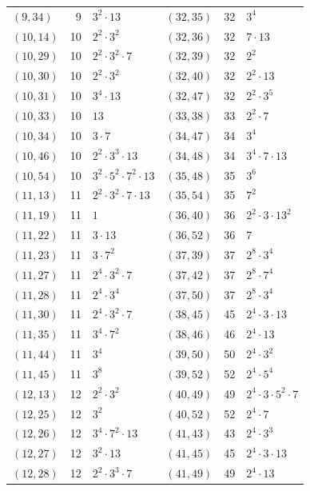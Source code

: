 \documentclass[11pt]{article}
\begin{document}
\begin{longtable}{@{}lrl@{\qquad}lrl@{}}
$(9,34)$ & 9 & $3^{2}\cdot 13$ & $(32,35)$ & 32 & $3^{4}$\\
$(10,14)$ & 10 & $2^{2}\cdot 3^{2}$ & $(32,36)$ & 32 & $7\cdot 13$\\
$(10,29)$ & 10 & $2^{2}\cdot 3^{2}\cdot 7$ & $(32,39)$ & 32 & $2^{2}$\\
$(10,30)$ & 10 & $2^{2}\cdot 3^{2}$ & $(32,40)$ & 32 & $2^{2}\cdot 13$\\
$(10,31)$ & 10 & $3^{4}\cdot 13$ & $(32,47)$ & 32 & $2^{2}\cdot 3^{5}$\\
$(10,33)$ & 10 & $13$ & $(33,38)$ & 33 & $2^{2}\cdot 7$\\
$(10,34)$ & 10 & $3\cdot 7$ & $(34,47)$ & 34 & $3^{4}$\\
$(10,46)$ & 10 & $2^{2}\cdot 3^{3}\cdot 13$ & $(34,48)$ & 34 & $3^{4}\cdot 7\cdot 13$\\
$(10,54)$ & 10 & $3^{2}\cdot 5^{2}\cdot 7^{2}\cdot 13$ & $(35,48)$ & 35 & $3^{6}$\\
$(11,13)$ & 11 & $2^{2}\cdot 3^{2}\cdot 7\cdot 13$ & $(35,54)$ & 35 & $7^{2}$\\
$(11,19)$ & 11 & $1$ & $(36,40)$ & 36 & $2^{2}\cdot 3\cdot 13^{2}$\\
$(11,22)$ & 11 & $3\cdot 13$ & $(36,52)$ & 36 & $7$\\
$(11,23)$ & 11 & $3\cdot 7^{2}$ & $(37,39)$ & 37 & $2^{8}\cdot 3^{4}$\\
$(11,27)$ & 11 & $2^{4}\cdot 3^{2}\cdot 7$ & $(37,42)$ & 37 & $2^{8}\cdot 7^{4}$\\
$(11,28)$ & 11 & $2^{4}\cdot 3^{4}$ & $(37,50)$ & 37 & $2^{8}\cdot 3^{4}$\\
$(11,30)$ & 11 & $2^{4}\cdot 3^{2}\cdot 7$ & $(38,45)$ & 45 & $2^{4}\cdot 3\cdot 13$\\
$(11,35)$ & 11 & $3^{4}\cdot 7^{2}$ & $(38,46)$ & 46 & $2^{4}\cdot 13$\\
$(11,44)$ & 11 & $3^{4}$ & $(39,50)$ & 50 & $2^{4}\cdot 3^{2}$\\
$(11,45)$ & 11 & $3^{8}$ & $(39,52)$ & 52 & $2^{4}\cdot 5^{4}$\\
$(12,13)$ & 12 & $2^{2}\cdot 3^{2}$ & $(40,49)$ & 49 & $2^{4}\cdot 3\cdot 5^{2}\cdot 7$\\
$(12,25)$ & 12 & $3^{2}$ & $(40,52)$ & 52 & $2^{4}\cdot 7$\\
$(12,26)$ & 12 & $3^{4}\cdot 7^{2}\cdot 13$ & $(41,43)$ & 43 & $2^{4}\cdot 3^{3}$\\
$(12,27)$ & 12 & $3^{2}\cdot 13$ & $(41,45)$ & 45 & $2^{4}\cdot 3\cdot 13$\\
$(12,28)$ & 12 & $2^{2}\cdot 3^{3}\cdot 7$ & $(41,49)$ & 49 & $2^{4}\cdot 13$\\

\end{longtable}
\end{document}
